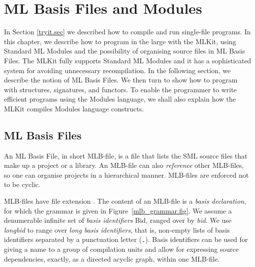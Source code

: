 \documentclass[12pt]{book}
\begin{document}
\chapter{ML Basis Files and Modules}
\label{mlb_and_modules.chap}
In Section \ref{tryit.sec} we described how to compile and run
single-file programs. In this chapter, we describe how to program in
the large with the MLKit, using
%
Standard ML Modules and the possibility of organising source files
in ML Basis Files. The MLKit fully supports Standard ML Modules and it
has a sophisticated system for avoiding unnecessary recompilation. In
the following section, we describe the notion of ML Basis Files. We then
turn to show how to program with structures, signatures, and functors.
To enable the programmer to write efficient programs using the Modules
language, we shall also explain how the MLKit compiles Modules language
constructs.

\section{ML Basis Files}
An ML Basis File, in short MLB-file,
%
%
is a file that lists the SML source files
that make up a project or a library. An MLB-file can also
%
\emph{reference} other MLB-files, so one can organise projects in a
hierarchical manner. MLB-files are enforced not to be cyclic.

MLB-files have file extension .
The content of an MLB-file is a \emph{basis declaration}, for which
the
%
grammar is given in Figure~\ref{mlb_grammar.fig}. We assume a
denumerable infinite set of \emph{basis identifiers} Bid, ranged over
by \emph{bid}. We use \emph{longbid} to range over \emph{long basis
  identifiers}, that is, non-empty lists of basis identifiers
separated by a punctuation letter (\texttt{.}). Basis identifiers can
be used for giving a name to a group of compilation units and allow
for expressing source dependencies, exactly, as a directed acyclic
graph, within one MLB-file.
\end{document}

